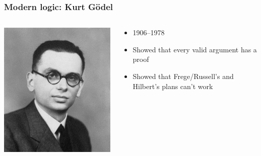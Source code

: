 \begin{frame}
  \frametitle{Modern logic: Kurt G\"odel}

  \begin{columns}
    \begin{column}{.5\textwidth}
      \includegraphics[height=.8\textheight]{../assets/goedel}
    \end{column}
    \begin{column}{.5\textwidth}
      \begin{itemize}[<+->]
        \item 1906--1978
        \item Showed that every valid argument has a proof
        \item Showed that Frege/Russell's and Hilbert's plans can't work
      \end{itemize}
    \end{column}
  \end{columns}
\end{frame}

